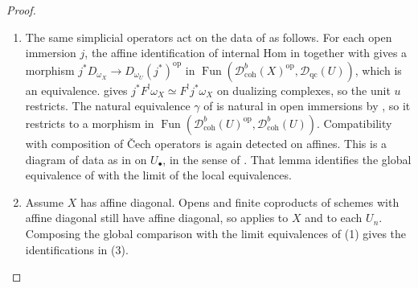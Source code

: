 \documentclass[11pt]{amsart}
\newcommand{\op}{{\operatorname{op}}}
\DeclareMathOperator{\Fun}{\mathrm{Fun}}
\newcommand{\Catbig}{\widehat{\mathrm{Cat}}}
\newcommand{\Dqc}{\mathcal D_{\mathrm{qc}}}
\newcommand{\Dbc}{\mathcal D^b_{\mathrm{coh}}}
\theoremstyle{plain}
\theoremstyle{definition}
\numberwithin{equation}{section}
\begin{document}
\begin{proof}
\begin{enumerate}
The \v Cech diagram $[n]\mapsto\Dqc(U_n)$ is the one constructed in .
Each simplicial operator $\alpha:[m]\to[n]$ is sent to a coproduct of open immersions $U_n\to U_m$.
On each summand,  gives a morphism $j^*F_{W,*}\to F_{V,*}j^*$ in $\Fun(\Dqc(W),\Dqc(V))$, which is an equivalence.
On a finite coproduct, $F_*$ is the product of the summands by  and the affine formula for restriction of scalars.
These equivalences are compatible with composition of operators: after restriction to every affine open, both composites are restriction of scalars along the same finite ring map, so \cite[\href{https://kerodon.net/tag/01DK}{Tag 01DK}]{Kerodon} applies in $\Fun$.
Thus the family of endofunctors $F_{U_n,*}$ is a morphism of the \v Cech diagram in $\Catbig_\infty$, i.e., a functor $\Delta\to\mathrm{End}(\Catbig_\infty)$ whose value at $[n]$ is $(\Dqc(U_n),F_{U_n,*})$.
The functor $F_*$ preserves $\Dbc$ by the affine case \cite[\href{https://stacks.math.columbia.edu/tag/00GJ}{Tag 00GJ}]{SP}, locality of coherence of cohomology sheaves as already used for $\Phi$, and locality of cohomological vanishing on a finite cover, and so does restriction, so the diagram restricts to $\Dbc$.
Its limit cone is $(\Dbc(X),F_*)$, by the equivalence $\Phi$ and the identification of limits in $\mathrm{End}(\Catbig_\infty)$.
Apply  to obtain the other two equivalences.
\item
The same simplicial operators act on the data of  as follows.
For each open immersion $j$, the affine identification of internal Hom in  together with \cite[\href{https://stacks.math.columbia.edu/tag/0A6A}{Tag 0A6A(3)}]{SP} gives a morphism $j^*D_{\omega_X}\to D_{\omega_U}(j^*)^{\op}$ in $\Fun(\Dbc(X)^{\op},\Dqc(U))$, which is an equivalence.
 gives $j^*F^!\omega_X\simeq F^!j^*\omega_X$ on dualizing complexes, so the unit $u$ restricts.
The natural equivalence $\gamma$ of  is natural in open immersions by , so it restricts to a morphism in $\Fun(\Dbc(U)^{\op},\Dbc(U))$.
Compatibility with composition of \v Cech operators is again detected on affines.
This is a diagram of data as in  on $U_\bullet$, in the sense of .
That lemma identifies the global equivalence of  with the limit of the local equivalences.
\item
Assume $X$ has affine diagonal.
Opens and finite coproducts of schemes with affine diagonal still have affine diagonal, so  applies to $X$ and to each $U_n$.
Composing the global comparison with the limit equivalences of \textup{(1)} gives the identifications in \textup{(3)}.
\end{enumerate}
\end{proof}
\end{document}
